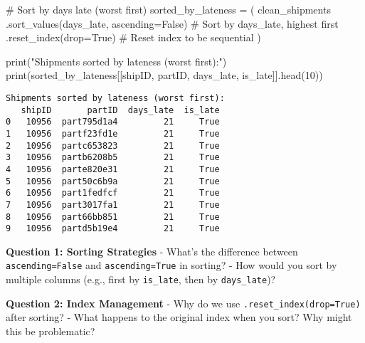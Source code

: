\documentclass[
  letterpaper,
  DIV=11,
  numbers=noendperiod]{scrartcl}
\newenvironment{Shaded}{\begin{snugshade}}{\end{snugshade}}
\newcommand{\BuiltInTok}[1]{\textcolor[rgb]{0.00,0.23,0.31}{#1}}
\newcommand{\CommentTok}[1]{\textcolor[rgb]{0.37,0.37,0.37}{#1}}
\newcommand{\DecValTok}[1]{\textcolor[rgb]{0.68,0.00,0.00}{#1}}
\newcommand{\NormalTok}[1]{\textcolor[rgb]{0.00,0.23,0.31}{#1}}
\newcommand{\OperatorTok}[1]{\textcolor[rgb]{0.37,0.37,0.37}{#1}}
\newcommand{\StringTok}[1]{\textcolor[rgb]{0.13,0.47,0.30}{#1}}
\newcommand{\VariableTok}[1]{\textcolor[rgb]{0.07,0.07,0.07}{#1}}
\begin{document}
\label{mental-model-4-sort}
\begin{Shaded}
\begin{Highlighting}[]
\CommentTok{\# Sort by days late (worst first)}
\NormalTok{sorted\_by\_lateness }\OperatorTok{=}\NormalTok{ (}
\NormalTok{    clean\_shipments}
\NormalTok{    .sort\_values(}\StringTok{\textquotesingle{}days\_late\textquotesingle{}}\NormalTok{, ascending}\OperatorTok{=}\VariableTok{False}\NormalTok{)  }\CommentTok{\# Sort by days\_late, highest first}
\NormalTok{    .reset\_index(drop}\OperatorTok{=}\VariableTok{True}\NormalTok{)  }\CommentTok{\# Reset index to be sequential}
\NormalTok{)}

\BuiltInTok{print}\NormalTok{(}\StringTok{"Shipments sorted by lateness (worst first):"}\NormalTok{)}
\BuiltInTok{print}\NormalTok{(sorted\_by\_lateness[[}\StringTok{\textquotesingle{}shipID\textquotesingle{}}\NormalTok{, }\StringTok{\textquotesingle{}partID\textquotesingle{}}\NormalTok{, }\StringTok{\textquotesingle{}days\_late\textquotesingle{}}\NormalTok{, }\StringTok{\textquotesingle{}is\_late\textquotesingle{}}\NormalTok{]].head(}\DecValTok{10}\NormalTok{))}
\end{Highlighting}
\end{Shaded}

\begin{verbatim}
Shipments sorted by lateness (worst first):
   shipID       partID  days_late  is_late
0   10956  part795d1a4         21     True
1   10956  partf23fd1e         21     True
2   10956  partc653823         21     True
3   10956  partb6208b5         21     True
4   10956  parte820e31         21     True
5   10956  part50c6b9a         21     True
6   10956  part1fedfcf         21     True
7   10956  part3017fa1         21     True
8   10956  part66bb851         21     True
9   10956  partd5b19e4         21     True
\end{verbatim}

\begin{tcolorbox}[enhanced jigsaw, colbacktitle=quarto-callout-important-color!10!white, opacitybacktitle=0.6, colframe=quarto-callout-important-color-frame, coltitle=black, left=2mm, titlerule=0mm, title=\textcolor{quarto-callout-important-color}{\faExclamation}\hspace{0.5em}{🤔 Discussion Questions: Sort Mental Model}, bottomtitle=1mm, opacityback=0, arc=.35mm, rightrule=.15mm, colback=white, breakable, bottomrule=.15mm, toprule=.15mm, toptitle=1mm, leftrule=.75mm]

\textbf{Question 1: Sorting Strategies} - What's the difference between
\texttt{ascending=False} and \texttt{ascending=True} in sorting? - How
would you sort by multiple columns (e.g., first by \texttt{is\_late},
then by \texttt{days\_late})?

\textbf{Question 2: Index Management} - Why do we use
\texttt{.reset\_index(drop=True)} after sorting? - What happens to the
original index when you sort? Why might this be problematic?

\end{tcolorbox}
\end{document}
